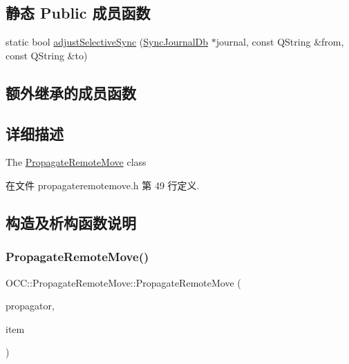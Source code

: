 \subsection*{静态 Public 成员函数}
\begin{DoxyCompactItemize}
\item 
static bool \hyperlink{class_o_c_c_1_1_propagate_remote_move_a7eb8e2df15545a657c3c533b19fcf699}{adjust\+Selective\+Sync} (\hyperlink{class_o_c_c_1_1_sync_journal_db}{Sync\+Journal\+Db} $\ast$journal, const Q\+String \&from, const Q\+String \&to)
\end{DoxyCompactItemize}
\subsection*{额外继承的成员函数}


\subsection{详细描述}
The \hyperlink{class_o_c_c_1_1_propagate_remote_move}{Propagate\+Remote\+Move} class 

在文件 propagateremotemove.\+h 第 49 行定义.



\subsection{构造及析构函数说明}
\mbox{\label{class_o_c_c_1_1_propagate_remote_move_a3302166605b951bff7117b100a8baada}} 
\subsubsection{\texorpdfstring{Propagate\+Remote\+Move()}{PropagateRemoteMove()}}
{\footnotesize\ttfamily O\+C\+C\+::\+Propagate\+Remote\+Move\+::\+Propagate\+Remote\+Move (\begin{DoxyParamCaption}\item[{\hyperlink{class_o_c_c_1_1_owncloud_propagator}{Owncloud\+Propagator} $\ast$}]{propagator,  }\item[{const \hyperlink{namespace_o_c_c_acb6b0db82893659fbd0c98d3c5b8e2b8}{Sync\+File\+Item\+Ptr} \&}]{item }\end{DoxyParamCaption})}



